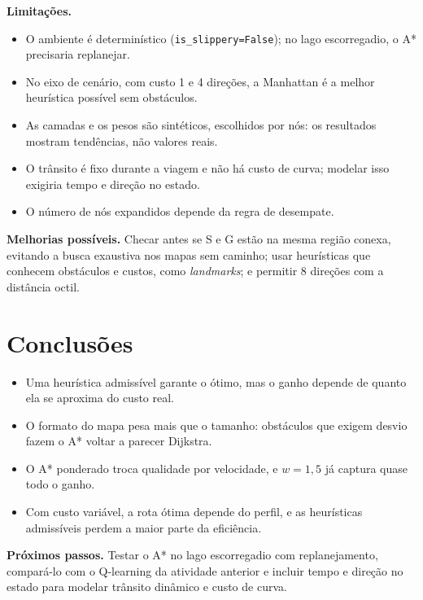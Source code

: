 \documentclass[11pt,a4paper]{article}
\begin{document}
\textbf{Limitações.}
\begin{itemize}
  \item O ambiente é determinístico (\texttt{is\_slippery=False}); no lago escorregadio, o A* precisaria replanejar.
  \item No eixo de cenário, com custo 1 e 4 direções, a Manhattan é a melhor heurística possível sem obstáculos.
  \item As camadas e os pesos são sintéticos, escolhidos por nós: os resultados mostram tendências, não valores reais.
  \item O trânsito é fixo durante a viagem e não há custo de curva; modelar isso exigiria tempo e direção no estado.
  \item O número de nós expandidos depende da regra de desempate.
\end{itemize}

\textbf{Melhorias possíveis.} Checar antes se S e G estão na mesma região conexa, evitando a busca exaustiva nos mapas
sem caminho; usar heurísticas que conhecem obstáculos e custos, como \emph{landmarks}; e permitir 8 direções com a
distância octil.

\section{Conclusões}

\begin{itemize}
  \item Uma heurística admissível garante o ótimo, mas o ganho depende de quanto ela se aproxima do custo real.
  \item O formato do mapa pesa mais que o tamanho: obstáculos que exigem desvio fazem o A* voltar a parecer Dijkstra.
  \item O A* ponderado troca qualidade por velocidade, e $w = 1{,}5$ já captura quase todo o ganho.
  \item Com custo variável, a rota ótima depende do perfil, e as heurísticas admissíveis perdem a maior parte da
    eficiência.
\end{itemize}

\textbf{Próximos passos.} Testar o A* no lago escorregadio com replanejamento, compará-lo com o Q-learning da atividade
anterior e incluir tempo e direção no estado para modelar trânsito dinâmico e custo de curva.
\end{document}
